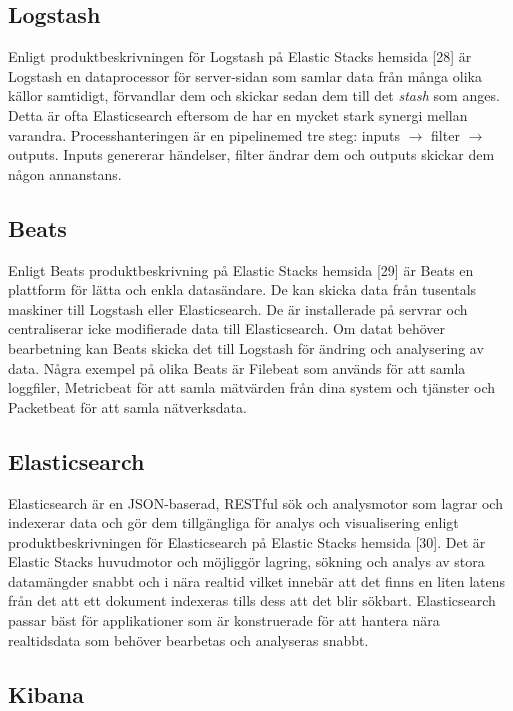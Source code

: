 \documentclass[12pt]{kththesis}
\begin{document}
\subsection{Logstash} 

Enligt produktbeskrivningen för Logstash på Elastic Stacks hemsida [28] är Logstash en dataprocessor för server-sidan som samlar data från många olika källor samtidigt, förvandlar dem och skickar sedan dem till det \textit{stash} som anges. Detta är ofta Elasticsearch eftersom de har en mycket stark synergi mellan varandra. Processhanteringen är en pipelinemed tre steg: inputs $\rightarrow$ filter $\rightarrow$ outputs. Inputs genererar händelser, filter ändrar dem och outputs skickar dem någon annanstans.

\subsection{Beats}

Enligt Beats produktbeskrivning på Elastic Stacks hemsida [29] är Beats en plattform för lätta och enkla datasändare. De kan skicka data från tusentals maskiner till Logstash eller Elasticsearch. De är installerade på servrar och centraliserar icke modifierade data till Elasticsearch. Om datat behöver bearbetning kan Beats skicka det till Logstash för ändring och analysering av data. Några exempel på olika Beats är Filebeat som används för att samla loggfiler, Metricbeat för att samla mätvärden från dina system och tjänster och Packetbeat för att samla nätverksdata. 

\subsection{Elasticsearch}

Elasticsearch är en JSON-baserad, RESTful sök och analysmotor som lagrar och indexerar data och gör dem tillgängliga för analys och visualisering enligt produktbeskrivningen för Elasticsearch på Elastic Stacks hemsida [30]. Det är Elastic Stacks huvudmotor och möjliggör lagring, sökning och analys av stora datamängder snabbt och i nära realtid vilket innebär att det finns en liten latens från det att ett dokument indexeras tills dess att det blir sökbart. Elasticsearch passar bäst för applikationer som är konstruerade för att hantera nära realtidsdata som behöver bearbetas och analyseras snabbt. 
 

\subsection{Kibana}
\end{document}
